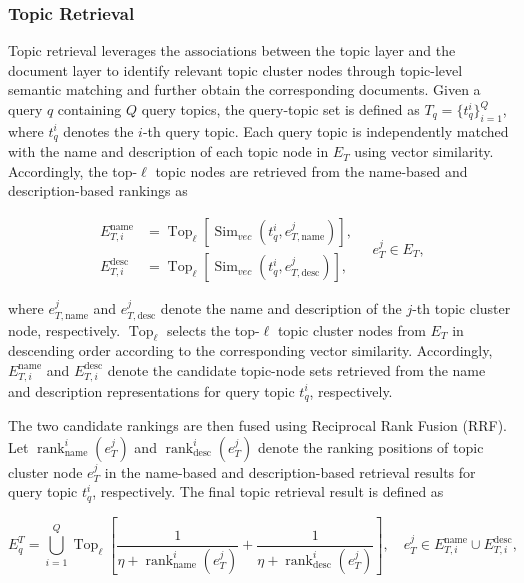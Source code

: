 \documentclass[preprint,12pt,authoryear]{elsarticle}
\begin{document}
\subsubsection{Topic Retrieval}
\label{subsubsec:topic-retrieval}

Topic retrieval leverages the associations between the topic layer and the document layer to identify relevant topic cluster nodes through topic-level semantic matching and further obtain the corresponding documents. Given a query $q$ containing $Q$ query topics, the query-topic set is defined as
$T_q=\{t_q^i\}_{i=1}^{Q}$, where $t_q^i$ denotes the $i$-th query topic.
Each query topic is independently matched with the name and description of each
topic node in $E_T$ using vector similarity. Accordingly, the top-$\ell$ topic
nodes are retrieved from the name-based and description-based rankings as

\begin{equation}
\begin{aligned}
E_{T,i}^{\mathrm{name}}
&=
\operatorname{Top}_{\ell}
\left[
\operatorname{Sim}_{vec}
(t_q^i,e_{T,\mathrm{name}}^j)
\right], \\
E_{T,i}^{\mathrm{desc}}
&=
\operatorname{Top}_{\ell}
\left[
\operatorname{Sim}_{vec}
(t_q^i,e_{T,\mathrm{desc}}^j)
\right],
\end{aligned}
\quad e_T^j \in E_T,
\label{eq:topic_candidates}
\end{equation}

where $e_{T,\mathrm{name}}^j$ and $e_{T,\mathrm{desc}}^j$ denote the name and description of the $j$-th topic cluster node, respectively. $\operatorname{Top}_{\ell}$ selects the top-$\ell$ topic cluster nodes from $E_T$ in descending order according to the corresponding vector similarity. Accordingly, $E_{T,i}^{\mathrm{name}}$ and $E_{T,i}^{\mathrm{desc}}$ denote the candidate topic-node sets retrieved from the name and description representations for query topic $t_q^i$, respectively.

The two candidate rankings are then fused using Reciprocal Rank Fusion (RRF). Let $\operatorname{rank}_{\mathrm{name}}^{i}(e_T^j)$ and $\operatorname{rank}_{\mathrm{desc}}^{i}(e_T^j)$ denote the ranking positions of topic cluster node $e_T^j$ in the name-based and description-based retrieval results for query topic $t_q^i$, respectively. The final topic retrieval result is defined as

\begin{equation}
E_q^T
=
\bigcup_{i=1}^{Q}
\operatorname{Top}_{\ell}
\left[
\frac{1}
{\eta+\operatorname{rank}_{\mathrm{name}}^{i}(e_T^j)}
+
\frac{1}
{\eta+\operatorname{rank}_{\mathrm{desc}}^{i}(e_T^j)}
\right],
\quad
e_T^j \in
E_{T,i}^{\mathrm{name}}
\cup
E_{T,i}^{\mathrm{desc}},
\label{eq:topic_retrieval}
\end{equation}
\end{document}
